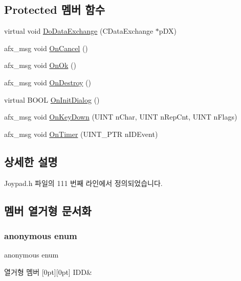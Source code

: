 \subsection*{Protected 멤버 함수}
\begin{DoxyCompactItemize}
\item 
virtual void \mbox{\hyperlink{class_motion_config_a1f27a900666b5c804f255f39b32d5dfd}{Do\+Data\+Exchange}} (C\+Data\+Exchange $\ast$p\+DX)
\item 
afx\+\_\+msg void \mbox{\hyperlink{class_motion_config_a3b2f649ce95dfb9f6b1efb8c7d8c9213}{On\+Cancel}} ()
\item 
afx\+\_\+msg void \mbox{\hyperlink{class_motion_config_a252355cb318ff1f62c63d89941b2758e}{On\+Ok}} ()
\item 
afx\+\_\+msg void \mbox{\hyperlink{class_motion_config_a45547ed24ce1f7fdabd5754ec526d0a9}{On\+Destroy}} ()
\item 
virtual B\+O\+OL \mbox{\hyperlink{class_motion_config_ac1e282a94d14b433764eeae95b4cab6b}{On\+Init\+Dialog}} ()
\item 
afx\+\_\+msg void \mbox{\hyperlink{class_motion_config_a210354b3272911c9ed7507c7262243f1}{On\+Key\+Down}} (U\+I\+NT n\+Char, U\+I\+NT n\+Rep\+Cnt, U\+I\+NT n\+Flags)
\item 
afx\+\_\+msg void \mbox{\hyperlink{class_motion_config_ac787a62c63e00f55582bb4695bbd04d6}{On\+Timer}} (U\+I\+N\+T\+\_\+\+P\+TR n\+I\+D\+Event)
\end{DoxyCompactItemize}


\subsection{상세한 설명}


Joypad.\+h 파일의 111 번째 라인에서 정의되었습니다.



\subsection{멤버 열거형 문서화}
\mbox{\label{class_motion_config_a8d6ecd105518fc0b880fdd120583c743}} 
\subsubsection{\texorpdfstring{anonymous enum}{anonymous enum}}
{\footnotesize\ttfamily anonymous enum}

\begin{DoxyEnumFields}{열거형 멤버}
[0pt][0pt]{}\mbox{\label{class_motion_config_a8d6ecd105518fc0b880fdd120583c743acda326956e507e0274c3deb88512c76a}} 
I\+DD&\\
\hline

\end{DoxyEnumFields}


